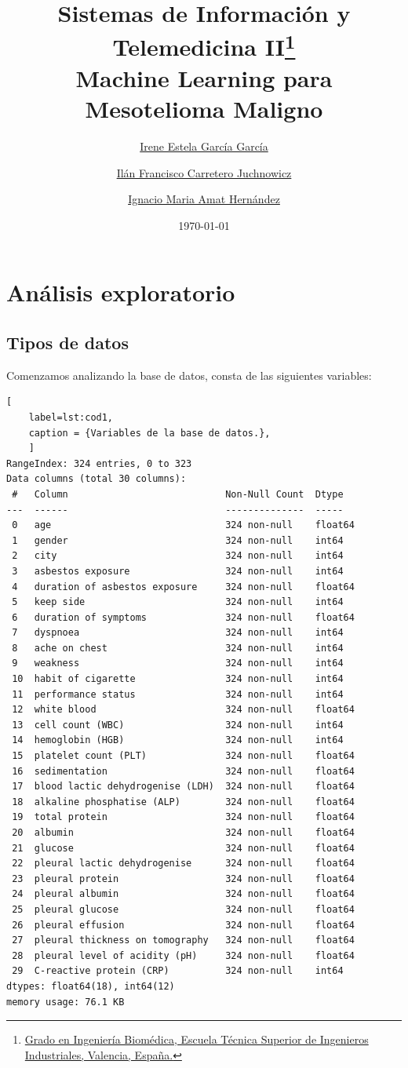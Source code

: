 \documentclass{article}
\title{Sistemas de Información y Telemedicina II\thanks{\href{https://www.upv.es/titulaciones/GIB/indexc.html}{Grado en Ingeniería Biomédica, Escuela Técnica Superior de Ingenieros Industriales, Valencia, España.}} \\\textbf{Machine Learning para Mesotelioma Maligno}}
\author{
\href{mailto:irgarga4@etsii.upv.es}{Irene Estela García García}
\and
\href{mailto:ilcarjuc@etsii.upv.es}{Ilán Francisco Carretero Juchnowicz}
\and
\href{mailto:igamher@etsid.upv.es}{Ignacio Maria Amat Hernández}
}
\date{\today}
\begin{document}
\maketitle
\newpage
\tableofcontents
\listoffigures
\lstlistoflistings
\newpage

\section{Análisis exploratorio}
\subsection{Tipos de datos}

Comenzamos analizando la base de datos,  consta de las siguientes
variables:
\\
\begin{lstlisting}[
	label=lst:cod1,
	caption = {Variables de la base de datos.},
	]
RangeIndex: 324 entries, 0 to 323
Data columns (total 30 columns):
 #   Column                            Non-Null Count  Dtype
---  ------                            --------------  -----
 0   age                               324 non-null    float64
 1   gender                            324 non-null    int64
 2   city                              324 non-null    int64
 3   asbestos exposure                 324 non-null    int64
 4   duration of asbestos exposure     324 non-null    float64
 5   keep side                         324 non-null    int64
 6   duration of symptoms              324 non-null    float64
 7   dyspnoea                          324 non-null    int64
 8   ache on chest                     324 non-null    int64
 9   weakness                          324 non-null    int64
 10  habit of cigarette                324 non-null    int64
 11  performance status                324 non-null    int64
 12  white blood                       324 non-null    float64
 13  cell count (WBC)                  324 non-null    int64
 14  hemoglobin (HGB)                  324 non-null    int64
 15  platelet count (PLT)              324 non-null    float64
 16  sedimentation                     324 non-null    float64
 17  blood lactic dehydrogenise (LDH)  324 non-null    float64
 18  alkaline phosphatise (ALP)        324 non-null    float64
 19  total protein                     324 non-null    float64
 20  albumin                           324 non-null    float64
 21  glucose                           324 non-null    float64
 22  pleural lactic dehydrogenise      324 non-null    float64
 23  pleural protein                   324 non-null    float64
 24  pleural albumin                   324 non-null    float64
 25  pleural glucose                   324 non-null    float64
 26  pleural effusion                  324 non-null    float64
 27  pleural thickness on tomography   324 non-null    float64
 28  pleural level of acidity (pH)     324 non-null    float64
 29  C-reactive protein (CRP)          324 non-null    int64
dtypes: float64(18), int64(12)
memory usage: 76.1 KB
\end{lstlisting}
\end{document}
